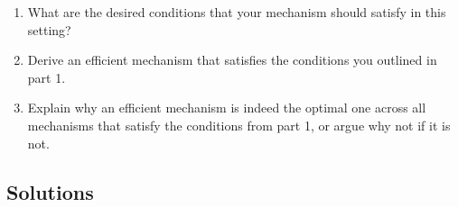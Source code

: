 \documentclass[a4paper]{article}
\newif\ifsolutions
\begin{document}
\begin{enumerate}
	\item What are the desired conditions that your mechanism should satisfy in this setting?
	
	\item Derive an efficient mechanism that satisfies the conditions you outlined in part 1.
	
	\item Explain why an efficient mechanism is indeed the optimal one across all mechanisms that satisfy the conditions from part 1, or argue why not if it is not.
\end{enumerate}

\ifsolutions
\subsection*{Solutions}
\end{document}
